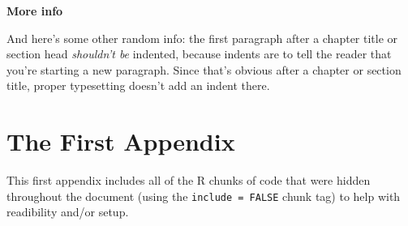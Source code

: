 \documentclass[msc,numbers]{coppe}
\begin{document}
  \textbf{More info}
  
  And here's some other random info: the first paragraph after a chapter title or section head \emph{shouldn't be} indented, because indents are to tell the reader that you're starting a new paragraph. Since that's obvious after a chapter or section title, proper typesetting doesn't add an indent there.
  
  \appendix
  
  \hypertarget{the-first-appendix}{%
  \chapter{The First Appendix}\label{the-first-appendix}}
  
  This first appendix includes all of the R chunks of code that were hidden throughout the document (using the \texttt{include\ =\ FALSE} chunk tag) to help with readibility and/or setup.
  
\end{document}
